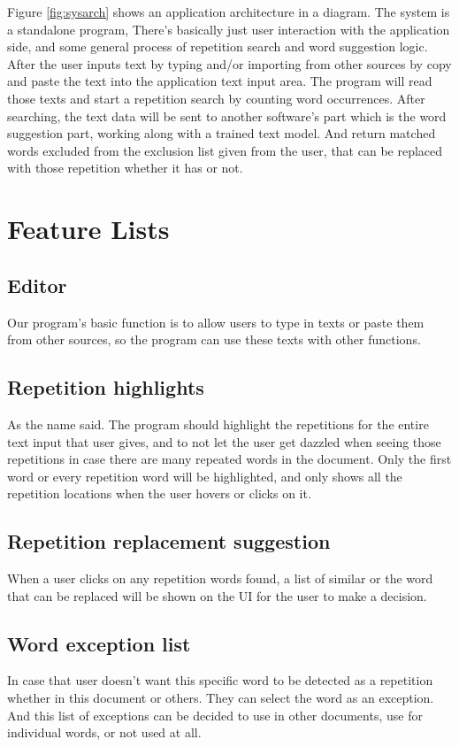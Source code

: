 \documentclass[12pt,oneside,openright,a4paper]{cpe-english-project}
\begin{document}
Figure \ref{fig:sysarch} shows an application architecture in a diagram. The system is a standalone program, There’s basically just user interaction with the application side, and some general process of repetition search and word suggestion logic. After the user inputs text by typing and/or importing from other sources by copy and paste the text into the application text input area. The program will read those texts and start a repetition search by counting word occurrences.  After searching, the text data will be sent to another software’s part which is the word suggestion part, working along with a trained text model. And return matched words excluded from the exclusion list given from the user, that can be replaced with those repetition whether it has or not.

\section{Feature Lists}

\subsection{Editor}
	Our program’s basic function is to allow users to type in texts or paste them from other sources, so the program can use these texts with other functions.

\subsection{Repetition highlights}
	As the name said. The program should highlight the repetitions for the entire text input that user gives, and to not let the user get dazzled when seeing those repetitions in case there are many repeated words in the document. Only the first word or every repetition word will be highlighted, and only shows all the repetition locations when the user hovers or clicks on it.
\subsection{Repetition replacement suggestion}

	When a user clicks on any repetition words found, a list of similar or the word that can be replaced will be shown on the UI for the user to make a decision.
\subsection{Word exception list}
	In case that user doesn’t want this specific word to be detected as a repetition whether in this document or others. They can select the word as an exception. And this list of exceptions can be decided to use in other documents, use for individual words, or not used at all.
\end{document}
